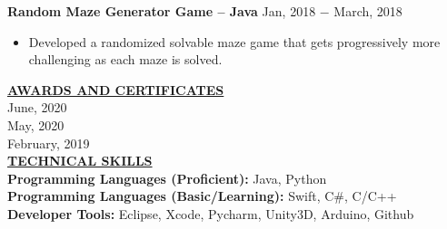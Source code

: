 \documentclass{article}
\begin{document}
\noindent \textbf{Random Maze Generator Game -- Java} \hfill  Jan, 2018 $-$ March, 2018
\begin{itemize}[noitemsep,nolistsep,leftmargin=*]
\item {Developed a randomized solvable maze game that gets progressively more challenging as each maze is solved.}\\
\end{itemize}

\noindent \textbf{\underline{AWARDS AND CERTIFICATES}} \\
 \hfill June, 2020 \\
 \hfill May, 2020 \\
 \hfill February, 2019 \\

\noindent \textbf{\underline{TECHNICAL SKILLS}} \\
\noindent \textbf{Programming Languages (Proficient):} Java, Python \\
\noindent \textbf{Programming Languages (Basic/Learning):} Swift, C\#, C/C++\\
\noindent \textbf{Developer Tools:} Eclipse, Xcode, Pycharm, Unity3D, Arduino, Github\\
\end{document}
